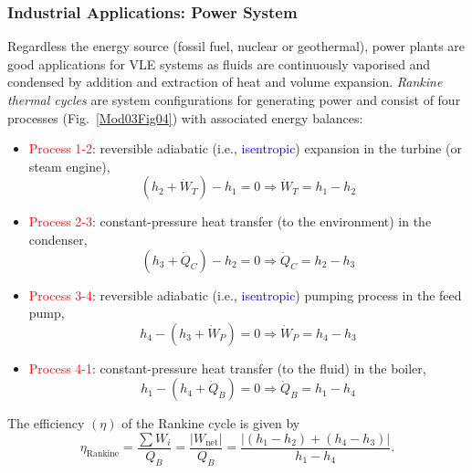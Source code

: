 \documentclass[12pts,a4paper,amsmath,amssymb,floatfix]{article}%
\newcommand{\frc}{\displaystyle\frac}
\newcommand{\blue}{\textcolor{blue}}
\begin{document}
   \subsubsection{Industrial Applications: Power System}
Regardless the energy source (fossil fuel, nuclear or geothermal), power plants are good applications for VLE systems as fluids are continuously vaporised and condensed by addition and extraction of heat and volume expansion. {\it Rankine thermal cycles} are system configurations for generating power and consist of four processes (Fig.~\ref{Mod03Fig04}) with associated energy balances:
     \begin{itemize}
      \item \textcolor{red}{Process 1-2}: reversible adiabatic (i.e., \blue{isentropic}) expansion in the turbine (or steam engine),
            \begin{displaymath}
               \left(h_{2} + \dot{W}_{T}\right)-h_{1} = 0 \Rightarrow \dot{W}_{T} = h_{1}-h_{2}
            \end{displaymath}
      \item \textcolor{red}{Process 2-3}: constant-pressure heat transfer (to the environment) in the condenser,
            \begin{displaymath}
               \left(h_{3} + \dot{Q}_{C}\right)-h_{2} = 0 \Rightarrow \dot{Q}_{C} = h_{2}-h_{3}
            \end{displaymath}
      \item \textcolor{red}{Process 3-4}: reversible adiabatic (i.e., \blue{isentropic}) pumping process in the feed pump,
            \begin{displaymath}
               h_{4} - \left(h_{3} + \dot{W}_{P}\right) = 0 \Rightarrow \dot{W}_{P} = h_{4}-h_{3}
            \end{displaymath}
      \item \textcolor{red}{Process 4-1}: constant-pressure heat transfer (to the fluid) in the boiler,
            \begin{displaymath}
               h_{1} - \left(h_{4} + \dot{Q}_{B}\right) = 0 \Rightarrow \dot{Q}_{B} = h_{1}-h_{4}
            \end{displaymath} 
     \end{itemize}
     The efficiency $\left(\eta\right)$ of the Rankine cycle is given by
           \begin{displaymath}
               \eta_{\text{Rankine}} = \frc{\sum W_{i}}{Q_{B}} = \frc{\left|W_{\text{net}}\right|}{Q_{B}} = \frc{\left|\left(h_{1}-h_{2}\right)+\left(h_{4}-h_{3}\right)\right|}{h_{1}-h_{4}}.
           \end{displaymath}
\end{document}
